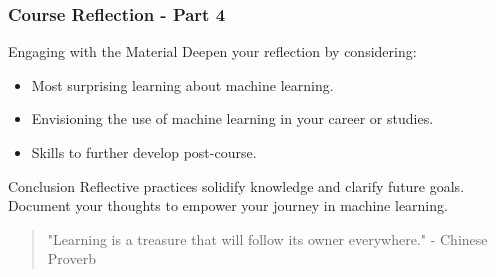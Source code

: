 \documentclass[aspectratio=169]{beamer}
\begin{document}
\begin{frame}[fragile]
    \frametitle{Course Reflection - Part 4}

    \begin{block}{Engaging with the Material}
        Deepen your reflection by considering:
        \begin{itemize}
            \item Most surprising learning about machine learning.
            \item Envisioning the use of machine learning in your career or studies.
            \item Skills to further develop post-course.
        \end{itemize}
    \end{block}

    \begin{block}{Conclusion}
        Reflective practices solidify knowledge and clarify future goals. Document your thoughts to empower your journey in machine learning.
    \end{block}

    \begin{quote}
        "Learning is a treasure that will follow its owner everywhere." - Chinese Proverb
    \end{quote}
\end{frame}
\end{document}
